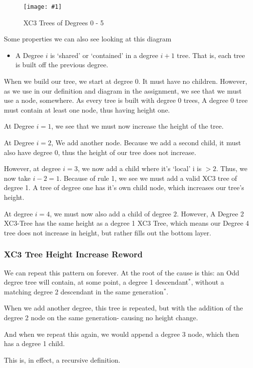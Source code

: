 \documentclass{article}
\newcommand{\figureInsetScaled}[3]
{
    \FloatBarrier{}
    \figureRaw{#1}{#2}{#3}
    \FloatBarrier{}
}
\newcommand{\figureRaw}[3]
{
    \begin{figure}[ht!]
        \centering
        \texttt{[image: \#1]}
        \caption{#2}
    \end{figure}
}
\begin{document}
\figureInsetScaled{images/experiment3/points.png}{XC3 Trees of Degrees 0 - 5}{0.65}

Some properties we can also see looking at this diagram
\begin{itemize}
    \item A Degree $i$ is `shared' or `contained' in a degree $i+1$ tree. That is, each tree is built off the previous degree.
\end{itemize}

When we build our tree, we start at degree 0. It must have no children. However, as we use in our definition and diagram in the assignment, we see that we must use a node, somewhere. As every tree is built with degree 0 trees, A degree 0 tree must contain at least one node, thus having height one.

At Degree $i=1$, we see that we must now increase the height of the tree.

At Degree $i=2$, We add another node. Because we add a second child, it must also have degree 0, thus the height of our tree does not increase.

However, at degree $i=3$, we now add a child where it's `local' i is $>2$. Thus, we now take $i-2 = 1$. Because of rule 1, we see we must add a valid XC3 tree of degree 1. A tree of degree one has it's own child node, which increases our tree's height.

At degree $i=4$, we must now also add a child of degree $2$. However, A Degree 2 XC3-Tree has the same height as a degree 1 XC3 Tree, which means our Degree 4 tree does not increase in height, but rather fills out the bottom layer.

\subsubsection{XC3 Tree Height Increase Reword}

We can repeat this pattern on forever. At the root of the cause is this: an Odd degree tree will contain, at some point, a degree 1 descendant$^{*}$, without a matching degree 2 descendant in the same generation$^{*}$. 

When we add another degree, this tree is repeated, but with the addition of the degree 2 node on the same generation- causing no height change.

And when we repeat this again, we would append a degree 3 node, which then has a degree 1 child.

This is, in effect, a recursive definition.
\end{document}
